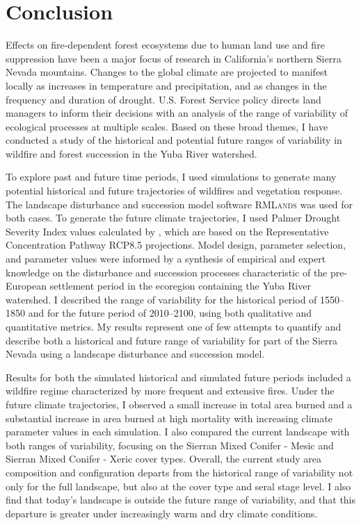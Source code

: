 
\chapter{Conclusion}

Effects on fire-dependent forest ecosystems due to human land use and fire suppression have been a major focus of research in California's northern Sierra Nevada mountains. Changes to the global climate are projected to manifest locally as increases in temperature and precipitation, and as changes in the frequency and duration of drought. U.S. Forest Service policy directs land managers to inform their decisions with an analysis of the range of variability of ecological processes at multiple scales. Based on these broad themes, I have conducted a study of the historical and potential future ranges of variability in wildfire and forest succession in the Yuba River watershed.

To explore past and future time periods, I used simulations to generate many potential historical and future trajectories of wildfires and vegetation response. The landscape disturbance and succession model software \textsc{RMLands} was used for both cases. To generate the future climate trajectories, I used Palmer Drought Severity Index values calculated by \citet{Cook2014}, which are based on the Representative Concentration Pathway RCP8.5 projections. Model design, parameter selection, and parameter values were informed by a synthesis of empirical and expert knowledge on the disturbance and succession processes characteristic of the pre-European settlement period in the ecoregion containing the Yuba River watershed. I described the range of variability for the historical period of 1550--1850 and for the future period of 2010--2100, using both qualitative and quantitative metrics. My results represent one of few attempts to quantify and describe both a historical and future range of variability for part of the Sierra Nevada using a landscape disturbance and succession model.

Results for both the simulated historical and simulated future periods included a wildfire regime characterized by more frequent and extensive fires. Under the future climate trajectories, I observed a small increase in total area burned and a substantial increase in area burned at high mortality with increasing climate parameter values in each simulation. I also compared the current landscape with both ranges of variability, focusing on the Sierran Mixed Conifer - Mesic and Sierran Mixed Conifer - Xeric cover types. Overall, the current study area composition and configuration departs from the historical range of variability not only for the full landscape, but also at the cover type and seral stage level. I also find that today's landscape is outside the future range of variability, and that this departure is greater under increasingly warm and dry climate conditions.

